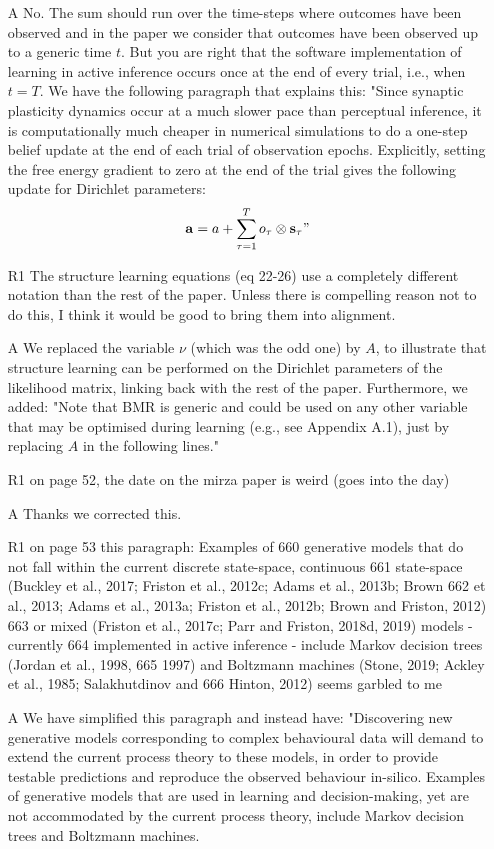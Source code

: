 \documentclass{article}
\begin{document}
\begin{itemize}
    \item[A] No. The sum should run over the time-steps where outcomes have been observed and in the paper we consider that outcomes have been observed up to a generic time $t$. But you are right that the software implementation of learning in active inference occurs once at the end of every trial, i.e., when $t=T$. We have the following paragraph that explains this: "Since synaptic plasticity dynamics occur at a much slower pace than perceptual inference, it is computationally much cheaper in numerical simulations to do a one-step belief update at the end of each trial of observation epochs. Explicitly, setting the free energy gradient to zero at the end of the trial gives the following update for Dirichlet parameters:
	\begin{equation}
	\label{eq: learning dirichlet one step}
  	    \bold a=  a +\sum_{\tau =1}^T o_\tau \otimes \bold s_\tau"
  	\end{equation}
  	\item[R1] The structure learning equations (eq 22-26) use a completely different notation than the rest of the paper. Unless there is compelling reason not to do this, I think it would be good to bring them into alignment.
  	\item[A] We replaced the variable $\nu$ (which was the odd one) by $A$, to illustrate that structure learning can be performed on the Dirichlet parameters of the likelihood matrix, linking back with the rest of the paper. Furthermore, we added: "Note that BMR is generic and could be used on any other variable that may be optimised during learning (e.g., see Appendix A.1), just by replacing $A$ in the following lines."
  	\item[R1] on page 52, the date on the mirza paper is weird (goes into the day)
    \item[A] Thanks we corrected this.
    \item[R1] on page 53 this paragraph:
Examples of
660 generative models that do not fall within the current discrete state-space, continuous
661 state-space (Buckley et al., 2017; Friston et al., 2012c; Adams et al., 2013b; Brown
662 et al., 2013; Adams et al., 2013a; Friston et al., 2012b; Brown and Friston, 2012)
663 or mixed (Friston et al., 2017c; Parr and Friston, 2018d, 2019) models - currently
664 implemented in active inference - include Markov decision trees (Jordan et al., 1998,
665 1997) and Boltzmann machines (Stone, 2019; Ackley et al., 1985; Salakhutdinov and
666 Hinton, 2012)
seems garbled to me
\item[A] We have simplified this paragraph and instead have: "Discovering new generative models corresponding to complex behavioural data will demand to extend the current process theory to these models, in order to provide testable predictions and reproduce the observed behaviour in-silico. Examples of generative models that are used in learning and decision-making, yet are not accommodated by the current process theory, include Markov decision trees and Boltzmann machines.

\end{itemize}
\end{document}
